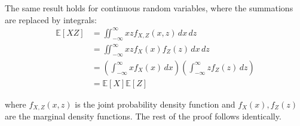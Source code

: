 \begin{solution}
    The same result holds for continuous random variables, where the summations are replaced by integrals:
    \[
        \begin{aligned}
            \mathbb{E}[XZ] &= \iint_{-\infty}^{\infty} xz f_{X,Z}(x,z) \,dx\,dz \\
            &= \iint_{-\infty}^{\infty} xz f_X(x)f_Z(z) \,dx\,dz \\
            &= \left(\int_{-\infty}^{\infty} x f_X(x) \,dx\right) \left(\int_{-\infty}^{\infty} z f_Z(z) \,dz\right) \\
            &= \mathbb{E}[X]\mathbb{E}[Z]
        \end{aligned}
    \]

    where $f_{X,Z}(x,z)$ is the joint probability density function and $f_X(x), f_Z(z)$ are the marginal density functions.
    The rest of the proof follows identically.
\end{solution}
